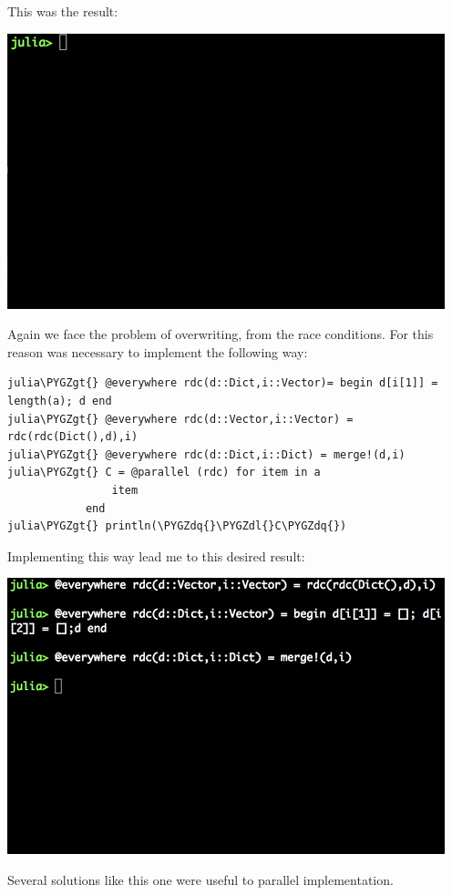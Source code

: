 \documentclass[letterpaper,10pt,english]{sphinxmanual}
\def\PYGZgt{\char`\>}
\def\PYGZdl{\char`\$}
\def\PYGZdq{\char`\"}
\begin{document}
This was the result:

\includegraphics{dict.gif}

Again we face the problem of overwriting, from the race conditions. For this reason was necessary to implement the following way:

\begin{Verbatim}[commandchars=\\\{\}]
julia\PYGZgt{} @everywhere rdc(d::Dict,i::Vector)= begin d[i[1]] = length(a); d end
julia\PYGZgt{} @everywhere rdc(d::Vector,i::Vector) = rdc(rdc(Dict(),d),i)
julia\PYGZgt{} @everywhere rdc(d::Dict,i::Dict) = merge!(d,i)
julia\PYGZgt{} C = @parallel (rdc) for item in a
                item
            end
julia\PYGZgt{} println(\PYGZdq{}\PYGZdl{}C\PYGZdq{})
\end{Verbatim}

Implementing this way lead me to this desired result:

\includegraphics{paradict.gif}

Several solutions like this one were useful to parallel implementation.
\end{document}
